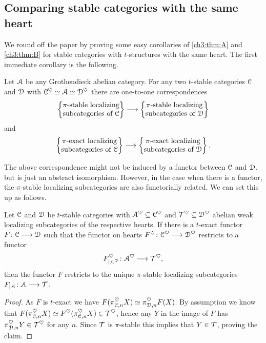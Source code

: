 \begin{center}
\end{center}





\subsection{Comparing stable categories with the same heart}

We round off the paper by proving some easy corollaries of \cref{ch3:thm:A} and \cref{ch3:thm:B} for stable categories with $t$-structures with the same heart. The first immediate corollary is the following. 

\begin{corollary}
    Let $\EuScript{A}$ be any Grothendieck abelian category. For any two $t$-stable categories $\EuScript{C}$ and $\EuScript{D}$ with $\EuScript{C}^\heartsuit \simeq \EuScript{A}\simeq \EuScript{D}^\heartsuit$ there are one-to-one correspondences
    \[\left\{ \begin{matrix} \pi\text{-stable localizing}\\ \text{subcategories of }\EuScript{C} \end{matrix} \right\}\longrightarrow\left\{ \begin{matrix} \pi\text{-stable localizing}\\ \text{subcategories of }\EuScript{D} \end{matrix} \right\}\]
    and 
    \[\left\{ \begin{matrix} \pi\text{-exact localizing}\\ \text{subcategories of }\EuScript{C} \end{matrix} \right\}\longrightarrow \left\{ \begin{matrix} \pi\text{-exact localizing}\\ \text{subcategories of }\EuScript{D} \end{matrix} \right\}.\]
\end{corollary}

The above correspondence might not be induced by a functor between $\EuScript{C}$ and $\EuScript{D}$, but is just an abstract isomorphism. However, in the case when there is a functor, the $\pi$-stable localizing subcategories are also functorially related. We can set this up as follows. 

\begin{lemma}
    \label{ch3:lm:restricted-functor-on-pi-localizing}
    Let $\EuScript{C}$ and $\EuScript{D}$ be $t$-stable categories with $\EuScript{A}^\heartsuit\subseteq \EuScript{C}^\heartsuit$ and $\mathcal{T}^\heartsuit\subseteq \EuScript{D}^\heartsuit$ abelian weak localizing subcategories of the respective hearts. 
    If there is a $t$-exact functor $F\colon\EuScript{C}\longrightarrow \EuScript{D}$ such that the functor on hearts $F^\heartsuit\colon \EuScript{C}^\heartsuit\longrightarrow \EuScript{D}^\heartsuit$ restricts to a functor 
    \[F^\heartsuit_{\vert \EuScript{A}^\heartsuit}\colon \EuScript{A}^\heartsuit \longrightarrow \mathcal{T}^\heartsuit,\]
    then the functor $F$ restricts to the unique $\pi$-stable localizing subcategories $F_{\vert \EuScript{A}}\colon\EuScript{A}\longrightarrow \mathcal{T}$. 
\end{lemma}
\begin{proof}
    As $F$ is $t$-exact we have $F(\pi_{\EuScript{C},n}^\heartsuit X)\simeq \pi_{\EuScript{D}, n}^\heartsuit F(X)$. By assumption we know that $F(\pi_{\EuScript{C},n}^{\heartsuit}X) \simeq F^\heartsuit(\pi_{\EuScript{C},n}^\heartsuit X) \in \mathcal{T}^\heartsuit$, hence any $Y$ in the image of $F$ has $\pi_{\EuScript{D},n}^\heartsuit Y \in \mathcal{T}^\heartsuit$ for any $n$. Since $\mathcal{T}$ is $\pi$-stable this implies that $Y\in \mathcal{T}$, proving the claim.
\end{proof}

